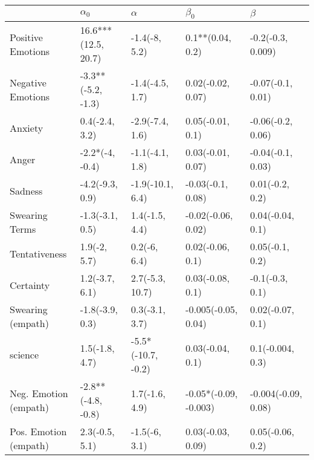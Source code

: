 \begin{tabular}{lllll}
\toprule
{} &           $\alpha_0$ &            $\alpha$ &              $\beta_0$ &              $\beta$ \\
\midrule
Positive Emotions     &  16.6***(12.5, 20.7) &       -1.4(-8, 5.2) &       0.1**(0.04, 0.2) &    -0.2(-0.3, 0.009) \\
Negative Emotions     &   -3.3**(-5.2, -1.3) &     -1.4(-4.5, 1.7) &      0.02(-0.02, 0.07) &    -0.07(-0.1, 0.01) \\
Anxiety               &       0.4(-2.4, 3.2) &     -2.9(-7.4, 1.6) &       0.05(-0.01, 0.1) &    -0.06(-0.2, 0.06) \\
Anger                 &      -2.2*(-4, -0.4) &     -1.1(-4.1, 1.8) &      0.03(-0.01, 0.07) &    -0.04(-0.1, 0.03) \\
Sadness               &      -4.2(-9.3, 0.9) &    -1.9(-10.1, 6.4) &      -0.03(-0.1, 0.08) &      0.01(-0.2, 0.2) \\
Swearing Terms        &      -1.3(-3.1, 0.5) &      1.4(-1.5, 4.4) &     -0.02(-0.06, 0.02) &     0.04(-0.04, 0.1) \\
Tentativeness         &         1.9(-2, 5.7) &        0.2(-6, 6.4) &       0.02(-0.06, 0.1) &      0.05(-0.1, 0.2) \\
Certainty             &       1.2(-3.7, 6.1) &     2.7(-5.3, 10.7) &       0.03(-0.08, 0.1) &      -0.1(-0.3, 0.1) \\
Swearing (empath)     &      -1.8(-3.9, 0.3) &      0.3(-3.1, 3.7) &    -0.005(-0.05, 0.04) &     0.02(-0.07, 0.1) \\
science               &       1.5(-1.8, 4.7) &  -5.5*(-10.7, -0.2) &       0.03(-0.04, 0.1) &     0.1(-0.004, 0.3) \\
Neg. Emotion (empath) &   -2.8**(-4.8, -0.8) &      1.7(-1.6, 4.9) &  -0.05*(-0.09, -0.003) &  -0.004(-0.09, 0.08) \\
Pos. Emotion (empath) &       2.3(-0.5, 5.1) &       -1.5(-6, 3.1) &      0.03(-0.03, 0.09) &     0.05(-0.06, 0.2) \\
\bottomrule
\end{tabular}
